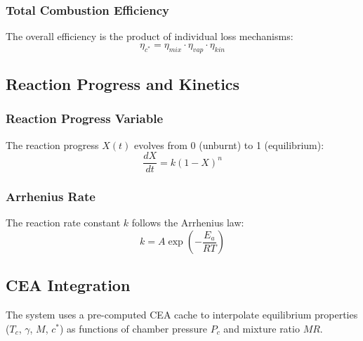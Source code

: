 \subsubsection{Total Combustion Efficiency}
The overall efficiency is the product of individual loss mechanisms:
\begin{equation}
\eta_{c^*} = \eta_{mix} \cdot \eta_{vap} \cdot \eta_{kin}
\end{equation}

\subsection{Reaction Progress and Kinetics}

\subsubsection{Reaction Progress Variable}
The reaction progress $X(t)$ evolves from 0 (unburnt) to 1 (equilibrium):
\begin{equation}
\frac{dX}{dt} = k (1 - X)^n
\end{equation}

\subsubsection{Arrhenius Rate}
The reaction rate constant $k$ follows the Arrhenius law:
\begin{equation}
k = A \exp\left(-\frac{E_a}{RT}\right)
\end{equation}

\subsection{CEA Integration}
The system uses a pre-computed CEA cache to interpolate equilibrium properties ($T_c$, $\gamma$, $M$, $c^*$) as functions of chamber pressure $P_c$ and mixture ratio $MR$.
